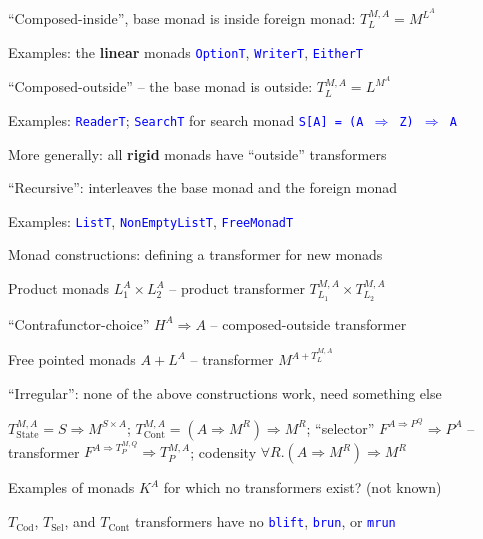 ``Composed-inside'', base monad is inside foreign monad: $T_{L}^{M,A}=M^{L^{A}}$

Examples: the \textbf{linear} monads \texttt{\textcolor{blue}{\footnotesize{}OptionT}},
\texttt{\textcolor{blue}{\footnotesize{}WriterT}}, \texttt{\textcolor{blue}{\footnotesize{}EitherT}} 

``Composed-outside'' – the base monad is outside: $T_{L}^{M,A}=L^{M^{A}}$

Examples: \texttt{\textcolor{blue}{\footnotesize{}ReaderT}}; \texttt{\textcolor{blue}{\footnotesize{}SearchT}}
for search monad \texttt{\textcolor{blue}{\footnotesize{}S{[}A{]}
= (A $\Rightarrow$ Z) $\Rightarrow$ A}} 

More generally: all \textbf{rigid} monads have ``outside'' transformers

``Recursive'': interleaves the base monad and the foreign monad

Examples: \texttt{\textcolor{blue}{\footnotesize{}ListT}}, \texttt{\textcolor{blue}{\footnotesize{}NonEmptyListT}},
\texttt{\textcolor{blue}{\footnotesize{}FreeMonadT}} 

Monad constructions: defining a transformer for new monads

Product monads $L_{1}^{A}\times L_{2}^{A}$ – product transformer
$T_{L_{1}}^{M,A}\times T_{L_{2}}^{M,A}$

``Contrafunctor-choice'' $H^{A}\Rightarrow A$ – composed-outside
transformer

Free pointed monads $A+L^{A}$ – transformer $M^{A+T_{L}^{M,A}}$

``Irregular'': none of the above constructions work, need something
else

{\footnotesize{}$T_{\text{State}}^{M,A}=S\Rightarrow M^{S\times A}$};
{\footnotesize{}$T_{\text{Cont}}^{M,A}=\left(A\Rightarrow M^{R}\right)\Rightarrow M^{R}$};
``selector'' {\footnotesize{}$F^{A\Rightarrow P^{Q}}\Rightarrow P^{A}$}
– transformer $F^{A\Rightarrow T_{P}^{M,Q}}\Rightarrow T_{P}^{M,A}$;
codensity {\footnotesize{}$\forall R.\left(A\Rightarrow M^{R}\right)\Rightarrow M^{R}$}{\footnotesize\par}

Examples of monads $K^{A}$ for which no transformers exist? (not
known)

{\footnotesize{}\vspace{-0.4cm}}$T_{\text{Cod}}$, $T_{\text{Sel}}$,
and $T_{\text{Cont}}$ transformers have no \texttt{\textcolor{blue}{\footnotesize{}blift}},
\texttt{\textcolor{blue}{\footnotesize{}brun}}, or \texttt{\textcolor{blue}{\footnotesize{}mrun}} 

